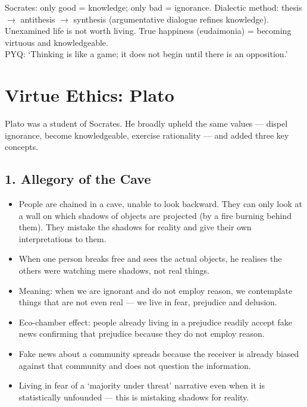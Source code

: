 \begin{QuickRevision}
Socrates: only good = knowledge; only bad = ignorance. Dialectic method: thesis $\rightarrow$ antithesis $\rightarrow$ synthesis (argumentative dialogue refines knowledge). Unexamined life is not worth living. True happiness (eudaimonia) = becoming virtuous and knowledgeable.\\
PYQ: `Thinking is like a game; it does not begin until there is an opposition.'
\end{QuickRevision}

\section{Virtue Ethics: Plato}

Plato was a student of Socrates. He broadly upheld the same values --- dispel ignorance, become knowledgeable, exercise rationality --- and added three key concepts.

\subsection*{1. Allegory of the Cave}
\begin{KeyConcept}
\begin{itemize}
\item People are chained in a cave, unable to look backward. They can only look at a wall on which shadows of objects are projected (by a fire burning behind them). They mistake the shadows for reality and give their own interpretations to them.
\item When one person breaks free and sees the actual objects, he realises the others were watching mere shadows, not real things.
\item Meaning: when we are ignorant and do not employ reason, we contemplate things that are not even real --- we live in fear, prejudice and delusion.
\end{itemize}
\end{KeyConcept}

\begin{ExampleBox}
\begin{itemize}
\item Eco-chamber effect: people already living in a prejudice readily accept fake news confirming that prejudice because they do not employ reason.
\item Fake news about a community spreads because the receiver is already biased against that community and does not question the information.
\item Living in fear of a `majority under threat' narrative even when it is statistically unfounded --- this is mistaking shadows for reality.
\end{itemize}
\end{ExampleBox}

